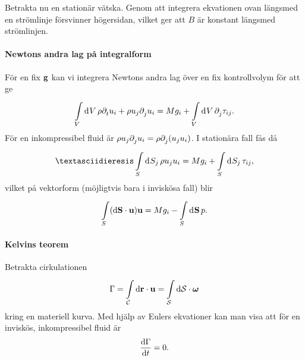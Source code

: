 Betrakta nu en stationär vätska. Genom att integrera ekvationen ovan längsmed en strömlinje försvinner högersidan, vilket ger att $B$ är konstant längsmed strömlinjen.

\paragraph{Newtons andra lag på integralform}
För en fix $\vb{g}$ kan vi integrera Newtons andra lag över en fix kontrollvolym för att ge
\begin{align*}
	\int\limits_{V}^{}\dd[]{V}\rho\partial_{t}^{}u_{i} + \rho u_{j}\partial_{j}^{}u_{i} = Mg_{i} + \int\limits_{V}^{}\dd[]{V}\partial_{j}^{}\tau_{ij}.
\end{align*}
För en inkompressibel fluid är $\rho u_{j}\partial_{j}^{}u_{i} = \rho \partial_{j}^{}(u_{j}u_{i})$. I stationära fall fås då
\begin{align*}
¨	\integ{S}{}{S_{j}}{\rho u_{j}u_{i}} = Mg_{i} + \integ{S}{}{S_{j}}{\tau_{ij}},
\end{align*}
vilket på vektorform (möjligtvis bara i inviskösa fall) blir
\begin{align*}
	\int\limits_{S}(\dd{\vb{S}}\cdot\vb{u})\vb{u} = Mg_{i} - \int\limits_{S}^{}\dd[]{\vb{S}}p.
\end{align*}

\paragraph{Kelvins teorem}
Betrakta cirkulationen
\begin{align*}
	\Gamma = \int\limits_{\mathcal{C}}^{}\dd{\vb{r}}\cdot \vb{u} = \int\limits_{\mathcal{S}}^{}\dd{\vb{\mathcal{S}}}\cdot \vb*{\omega}
\end{align*}
kring en materiell kurva. Med hjälp av Eulers ekvationer kan man visa att för en inviskös, inkompressibel fluid är
\begin{align*}
	\dv{\Gamma}{t} = 0.
\end{align*}